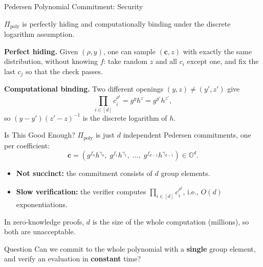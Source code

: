 \documentclass{zkdl-presentation-template}
\begin{document}
    \begin{frame}{Pedersen Polynomial Commitment: Security}
        \begin{lemma}
            $\Pi_{\text{poly}}$ is perfectly hiding and computationally binding under the discrete logarithm assumption.
        \end{lemma}
        \pause

        \textbf{Perfect hiding.} Given $(\rho, y)$, one can sample $(\mathbf{c}, z)$ with exactly the same distribution, without knowing $f$: take random $z$ and all $c_i$ except one, and fix the last $c_j$ so that the check passes.
        \pause

        \textbf{Computational binding.} Two different openings $(y, z) \neq (y', z')$ give
        \begin{equation*}
            \prod_{i \in [d]} c_i^{\rho^i} = g^y h^z = g^{y'} h^{z'},
        \end{equation*}
        so $(y - y')(z' - z)^{-1}$ is the discrete logarithm of $h$.
    \end{frame}

    \begin{frame}{Is This Good Enough?}
        $\Pi_{\text{poly}}$ is just $d$ independent Pedersen commitments, one per coefficient:
        \begin{equation*}
            \mathbf{c} = (g^{f_0}h^{\gamma_0}, \; g^{f_1}h^{\gamma_1}, \; \dots, \; g^{f_{d-1}}h^{\gamma_{d-1}}) \in \mathbb{G}^d.
        \end{equation*}
        \pause

        \begin{itemize}
            \item \textcolor{oc-red-8}{\textbf{Not succinct:}} the commitment consists of $d$ group elements.\pause
            \item \textcolor{oc-red-8}{\textbf{Slow verification:}} the verifier computes $\prod_{i \in [d]} c_i^{\rho^i}$, i.e., $O(d)$ exponentiations.
        \end{itemize}
        \pause

        In zero-knowledge proofs, $d$ is the size of the whole computation (millions), so both are unacceptable.

        \begin{questionblock}{Question}
            Can we commit to the whole polynomial with a \textbf{single} group element, and verify an evaluation in \textbf{constant} time?
        \end{questionblock}
    \end{frame}
\end{document}
